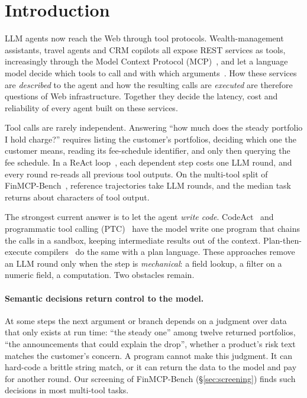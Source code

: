 \section{Introduction}
\label{sec:intro}

LLM agents now reach the Web through tool protocols. Wealth-management assistants, travel agents and CRM copilots all expose REST services as tools, increasingly through the Model Context Protocol (MCP)~\cite{anthropic2024mcp}, and let a language model decide which tools to call and with which arguments~\cite{schick2023toolformer,yao2023react}. How these services are \emph{described} to the agent and how the resulting calls are \emph{executed} are therefore questions of Web infrastructure. Together they decide the latency, cost and reliability of every agent built on these services.

Tool calls are rarely independent. Answering ``how much does the steady portfolio I hold charge?'' requires listing the customer's portfolios, deciding which one the customer means, reading its fee-schedule identifier, and only then querying the fee schedule. In a ReAct loop~\cite{yao2023react}, each dependent step costs one LLM round, and every round re-reads all previous tool outputs. On the multi-tool split of FinMCP-Bench~\cite{zhu2026finmcp}, reference trajectories take  LLM rounds, and the median task returns about  characters of tool output.

The strongest current answer is to let the agent \emph{write code}. CodeAct~\cite{wang2024codeact} and programmatic tool calling (PTC)~\cite{anthropic2025advancedtooluse} have the model write one program that chains the calls in a sandbox, keeping intermediate results out of the context. Plan-then-execute compilers~\cite{xu2023rewoo,kim2024llmcompiler} do the same with a plan language. These approaches remove an LLM round only when the step is \emph{mechanical}: a field lookup, a filter on a numeric field, a computation. Two obstacles remain.

\paragraph{Semantic decisions return control to the model.} At some steps the next argument or branch depends on a judgment over data that only exists at run time: ``the steady one'' among twelve returned portfolios, ``the announcements that could explain the drop'', whether a product's risk text matches the customer's concern. A program cannot make this judgment. It can hard-code a brittle string match, or it can return the data to the model and pay for another round. Our screening of FinMCP-Bench (\S\ref{sec:screening}) finds such decisions in most multi-tool tasks.

